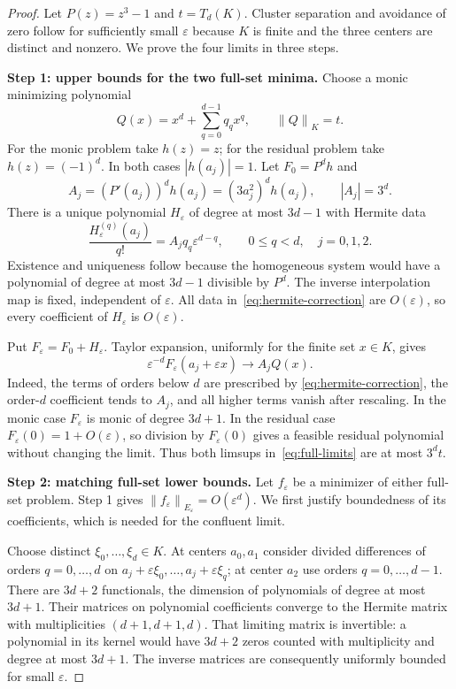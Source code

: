 \documentclass[11pt,a4paper]{article}
\theoremstyle{remark}
\newcommand{\norm}[1]{\left\lVert#1\right\rVert}
\newcommand{\eps}{\varepsilon}
\begin{document}
\begin{proof}
Let $P(z)=z^3-1$ and $t=T_d(K)$. Cluster separation and avoidance of zero
follow for sufficiently small $\eps$ because $K$ is finite and the three
centers are distinct and nonzero. We prove the four limits in three steps.

\medskip
\textbf{Step 1: upper bounds for the two full-set minima.}
Choose a monic minimizing polynomial
\[
 Q(x)=x^d+\sum_{q=0}^{d-1}q_qx^q,\qquad \norm Q_K=t.
\]
For the monic problem take $h(z)=z$; for the residual problem take
$h(z)=(-1)^d$. In both cases $|h(a_j)|=1$.
Let $F_0=P^dh$ and
\[
 A_j=(P'(a_j))^dh(a_j)=(3a_j^2)^dh(a_j),\qquad |A_j|=3^d.
\]
There is a unique polynomial $H_\eps$ of degree at most $3d-1$ with Hermite
data
\begin{equation}\label{eq:hermite-correction}
 \frac{H_\eps^{(q)}(a_j)}{q!}=A_jq_q\eps^{d-q},
 \qquad 0\le q<d,\quad j=0,1,2.
\end{equation}
Existence and uniqueness follow because the homogeneous system would have a
polynomial of degree at most $3d-1$ divisible by $P^d$.
The inverse interpolation map is fixed, independent of $\eps$. All data
in~\eqref{eq:hermite-correction} are $O(\eps)$, so every coefficient of
$H_\eps$ is $O(\eps)$.

Put $F_\eps=F_0+H_\eps$. Taylor expansion, uniformly for the finite set
$x\in K$, gives
\begin{equation}\label{eq:local-upper}
 \eps^{-d}F_\eps(a_j+\eps x)\longrightarrow A_jQ(x).
\end{equation}
Indeed, the terms of orders below $d$ are prescribed by
\eqref{eq:hermite-correction}, the order-$d$ coefficient tends to $A_j$,
and all higher terms vanish after rescaling.
In the monic case $F_\eps$ is monic of degree $3d+1$.
In the residual case $F_\eps(0)=1+O(\eps)$, so division by $F_\eps(0)$ gives
a feasible residual polynomial without changing the limit.
Thus both limsups in~\eqref{eq:full-limits} are at most $3^dt$.

\medskip
\textbf{Step 2: matching full-set lower bounds.}
Let $f_\eps$ be a minimizer of either full-set problem. Step 1 gives
$\norm{f_\eps}_{E_\eps}=O(\eps^d)$.
We first justify boundedness of its coefficients, which is needed for the
confluent limit.

Choose distinct $\xi_0,\ldots,\xi_d\in K$. At centers $a_0,a_1$ consider
divided differences of orders $q=0,\ldots,d$ on
$a_j+\eps\xi_0,\ldots,a_j+\eps\xi_q$; at center $a_2$ use orders
$q=0,\ldots,d-1$. There are $3d+2$ functionals, the dimension of polynomials
of degree at most $3d+1$. Their matrices on polynomial coefficients converge
to the Hermite matrix with multiplicities $(d+1,d+1,d)$.
That limiting matrix is invertible: a polynomial in its kernel would have
$3d+2$ zeros counted with multiplicity and degree at most $3d+1$.
The inverse matrices are consequently uniformly bounded for small $\eps$.


\end{proof}
\end{document}
